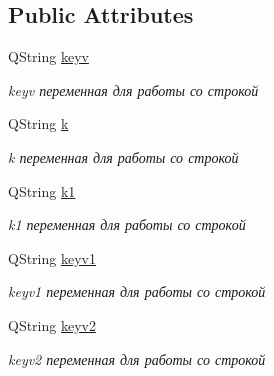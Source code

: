 \subsection*{Public Attributes}
\begin{DoxyCompactItemize}
\item 
\mbox{\label{class_main_window_ac176a8ec3ec8497f5409a190a3831fdf}} 
Q\+String \mbox{\hyperlink{class_main_window_ac176a8ec3ec8497f5409a190a3831fdf}{keyv}}
\begin{DoxyCompactList}\small\item\em keyv переменная для работы со строкой \end{DoxyCompactList}\item 
\mbox{\label{class_main_window_aeb41834c8f6e4960da36cef51bf20a07}} 
Q\+String \mbox{\hyperlink{class_main_window_aeb41834c8f6e4960da36cef51bf20a07}{k}}
\begin{DoxyCompactList}\small\item\em k переменная для работы со строкой \end{DoxyCompactList}\item 
\mbox{\label{class_main_window_a974e36d12fb540c59fe1d00846e3ac3a}} 
Q\+String \mbox{\hyperlink{class_main_window_a974e36d12fb540c59fe1d00846e3ac3a}{k1}}
\begin{DoxyCompactList}\small\item\em k1 переменная для работы со строкой \end{DoxyCompactList}\item 
\mbox{\label{class_main_window_ad5a7ed1e334bc542e12d1bc7b01cfd6c}} 
Q\+String \mbox{\hyperlink{class_main_window_ad5a7ed1e334bc542e12d1bc7b01cfd6c}{keyv1}}
\begin{DoxyCompactList}\small\item\em keyv1 переменная для работы со строкой \end{DoxyCompactList}\item 
\mbox{\label{class_main_window_a39cd471e1259fcc701f02f23302495e4}} 
Q\+String \mbox{\hyperlink{class_main_window_a39cd471e1259fcc701f02f23302495e4}{keyv2}}
\begin{DoxyCompactList}\small\item\em keyv2 переменная для работы со строкой \end{DoxyCompactList}\item 

\end{DoxyCompactItemize}
